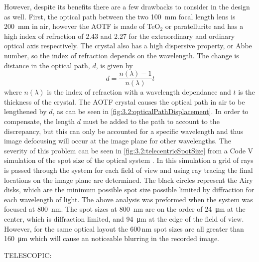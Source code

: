 \documentclass[12pt]{article}
\begin{document}
However, despite its benefits there are a few drawbacks to consider in the design as well. First, the optical path between the two 100~mm focal length lens is 200~mm in air, however the AOTF is made of TeO$_{2}$  or paratellurite and has a high index of refraction of 2.43 and 2.27 for the extraordinary and ordinary optical axis respectively. The crystal also has a high dispersive property, or Abbe number, so the index of refraction depends on the wavelength. The change is distance in the optical path, $d$, is given by
\begin{equation}
    \ d = \frac{n(\lambda)-1}{n(\lambda)}t
    \label{eqn:3.2:opticalPathDisplacement}
\end{equation}
where $n(\lambda)$ is the index of refraction with a wavelength dependance and $t$ is the thickness of the crystal. The AOTF crystal causes the optical path in air to be lengthened by $d$, as can be seen in \autoref{fig:3.2:opticalPathDisplacement}. In order to compensate, the length $d$ must be added to the path to account to the discrepancy, but this can only be accounted for a specific wavelength and thus image defocusing will occur at the image plane for other wavelengths. The severity of this problem can be seen in \autoref{fig:3.2:telecentricSpotSize} from a Code V simulation of the spot size of the optical system . In this simulation a grid of rays is passed through the system for each field of view and using ray tracing the final locations on the image plane are determined. The black circles represent the Airy disks, which are the minimum possible spot size possible limited by diffraction for each wavelength of light. The above analysis was preformed when the system was focused at 800~nm. The spot sizes at 800~nm are on the order of 24~\si{\micro\meter} at the center, which is diffraction limited, and 94~\si{\micro\meter} at the edge of the field of view. However, for the same optical layout the 600\,nm spot sizes are all greater than 160~\si{\micro\meter} which will cause an noticeable blurring in the recorded image.

TELESCOPIC:
\end{document}
